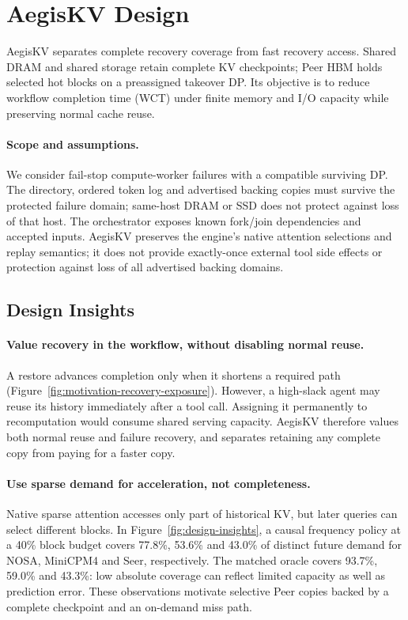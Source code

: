 \section{AegisKV Design}
\label{sec:design}

AegisKV separates complete recovery coverage from fast recovery access.
Shared DRAM and shared storage retain complete KV checkpoints; Peer HBM
holds selected hot blocks on a preassigned takeover DP. Its objective is
to reduce workflow completion time (WCT) under finite memory and I/O
capacity while preserving normal cache reuse.

\paragraph{Scope and assumptions.}
We consider fail-stop compute-worker failures with a compatible surviving
DP. The directory, ordered token log and advertised backing copies must
survive the protected failure domain; same-host DRAM or SSD does not
protect against loss of that host. The orchestrator exposes known
fork/join dependencies and accepted inputs. AegisKV preserves the engine's
native attention selections and replay semantics; it does not provide
exactly-once external tool side effects or protection against loss of all
advertised backing domains.

\subsection{Design Insights}
\label{sec:design-insights}

\paragraph{Value recovery in the workflow, without disabling normal reuse.}
A restore advances completion only when it shortens a required path
(Figure~\ref{fig:motivation-recovery-exposure}). However, a high-slack
agent may reuse its history immediately after a tool call. Assigning it
permanently to recomputation would consume shared serving capacity.
AegisKV therefore values both normal reuse and failure recovery, and
separates retaining any complete copy from paying for a faster copy.

\paragraph{Use sparse demand for acceleration, not completeness.}
Native sparse attention accesses only part of historical KV, but later
queries can select different blocks. In Figure~\ref{fig:design-insights},
a causal frequency policy at a 40\% block budget covers 77.8\%, 53.6\%
and 43.0\% of distinct future demand for NOSA, MiniCPM4 and Seer,
respectively. The matched oracle covers 93.7\%, 59.0\% and 43.3\%:
low absolute coverage can reflect limited capacity as well as prediction
error. These observations motivate selective Peer copies backed by a
complete checkpoint and an on-demand miss path.

